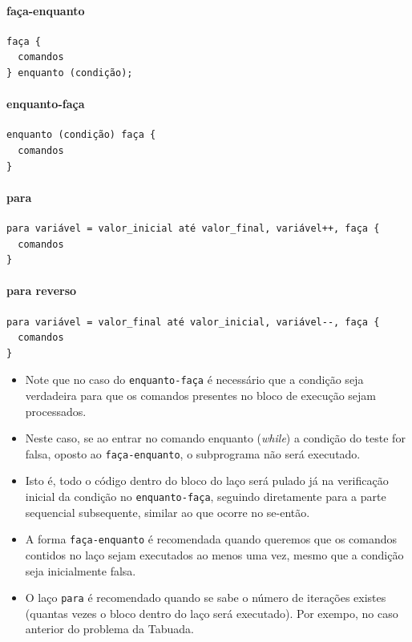 \documentclass[12pt,a4paper]{article}
\begin{document}
    \hypertarget{fauxe7a-enquanto}{%
\paragraph{faça-enquanto}\label{fauxe7a-enquanto}}

\begin{verbatim}
faça { 
  comandos 
} enquanto (condição);
\end{verbatim}

    \hypertarget{enquanto-fauxe7a}{%
\paragraph{enquanto-faça}\label{enquanto-fauxe7a}}

\begin{verbatim}
enquanto (condição) faça { 
  comandos 
}
\end{verbatim}

    \hypertarget{para}{%
\paragraph{para}\label{para}}

\begin{verbatim}
para variável = valor_inicial até valor_final, variável++, faça { 
  comandos 
}
\end{verbatim}

    \hypertarget{para-reverso}{%
\paragraph{para reverso}\label{para-reverso}}

\begin{verbatim}
para variável = valor_final até valor_inicial, variável--, faça { 
  comandos 
}
\end{verbatim}

    \begin{itemize}
\item
  Note que no caso do \texttt{enquanto-faça} é necessário que a condição
  seja verdadeira para que os comandos presentes no bloco de execução
  sejam processados.
\item
  Neste caso, se ao entrar no comando enquanto (\emph{while}) a condição
  do teste for falsa, oposto ao \texttt{faça-enquanto}, o subprograma
  não será executado.
\item
  Isto é, todo o código dentro do bloco do laço será pulado já na
  verificação inicial da condição no \texttt{enquanto-faça}, seguindo
  diretamente para a parte sequencial subsequente, similar ao que ocorre
  no se-então.
\item
  A forma \texttt{faça-enquanto} é recomendada quando queremos que os
  comandos contidos no laço sejam executados ao menos uma vez, mesmo que
  a condição seja inicialmente falsa.
\item
  O laço \texttt{para} é recomendado quando se sabe o número de
  iterações existes (quantas vezes o bloco dentro do laço será
  executado). Por exempo, no caso anterior do problema da Tabuada.
\end{itemize}
\end{document}

